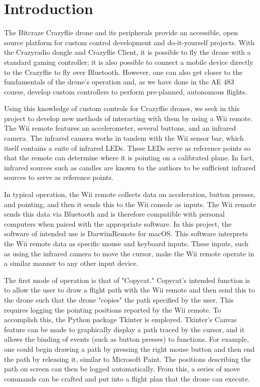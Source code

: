 \documentclass[conf]{new-aiaa}
\begin{document}
\section{Introduction}
The Bitcraze Crazyflie drone and its peripherals provide an accessible, open source platform for custom control development and do-it-yourself projects. \cite{cfclient} With the Crazyradio dongle and Crazyflie Client, it is possible to fly the drone with a standard gaming controller; it is also possible to connect a mobile device directly to the Crazyflie to fly over Bluetooth. However, one can also get closer to the fundamentals of the drone's operation and, as we have done in the AE 483 course, develop custom controllers to perform pre-planned, autonomous flights.

Using this knowledge of custom controls for Crazyflie drones, we seek in this project to develop new methods of interacting with them by using a Wii remote. \cite{darwiin} The Wii remote features an accelerometer, several buttons, and an infrared camera. The infrared camera works in tandem with the Wii sensor bar, which itself contains a suite of infrared LEDs. These LEDs serve as reference points so that the remote can determine where it is pointing on a calibrated plane. In fact, infrared sources such as candles are known to the authors to be sufficient infrared sources to serve as reference points.

In typical operation, the Wii remote collects data on acceleration, button presses, and pointing, and then it sends this to the Wii console as inputs. The Wii remote sends this data via Bluetooth and is therefore compatible with personal computers when paired with the appropriate software. In this project, the software of intended use is DarwiinRemote for macOS. This software interprets the Wii remote data as specific mouse and keyboard inputs. These inputs, such as using the infrared camera to move the cursor, make the Wii remote operate in a similar manner to any other input device.

The first mode of operation is that of "Copycat." Copycat's intended function is to allow the user to draw a flight path with the Wii remote and then send this to the drone such that the drone "copies" the path specified by the user. This requires logging the pointing positions reported by the Wii remote. To accomplish this, the Python package Tkinter is employed. \cite{tkinter} Tkinter's Canvas feature can be made to graphically display a path traced by the cursor, and it allows the binding of events (such as button presses) to functions. For example, one could begin drawing a path by pressing the right mouse button and then end the path by releasing it, similar to Microsoft Paint. The positions describing the path on screen can then be logged automatically. From this, a series of move commands can be crafted and put into a flight plan that the drone can execute.
\end{document}
